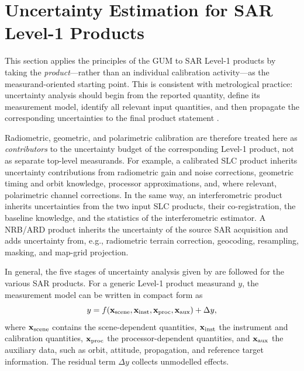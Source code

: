 \section{Uncertainty Estimation for SAR Level-1 Products} \label{sec:level1}

This section applies the principles of the \ac{GUM} to \ac{SAR} Level-1
products by taking the \emph{product}---rather than an individual calibration
activity---as the measurand-oriented starting point. This is consistent with
metrological practice: uncertainty analysis should begin from the reported
quantity, define its measurement model, identify all relevant input quantities,
and then propagate the corresponding uncertainties to the final product
statement \cite{JCGMGUM,QA4EO3}.


Radiometric, geometric, and polarimetric calibration are therefore treated here
as \emph{contributors} to the uncertainty budget of the corresponding Level-1
product, not as separate top-level measurands. For example, a calibrated \ac{SLC}
product inherits uncertainty contributions from radiometric gain and noise
corrections, geometric timing and orbit knowledge, processor approximations,
and, where relevant, polarimetric channel corrections. In the same way, an
interferometric product inherits uncertainties from the two input \ac{SLC}
products, their co-registration, the baseline knowledge, and the statistics of
the interferometric estimator. A \ac{NRB}/\ac{ARD} product inherits the
uncertainty of the source \ac{SAR} acquisition and adds uncertainty from, e.g.,
radiometric terrain correction, geocoding, resampling, masking, and map-grid
projection.

In general, the five stages of uncertainty analysis given by \cite{QA4EO1} are
followed for the various \ac{SAR} products. For a generic Level-1 product
measurand $y$, the measurement model can be written in compact form as
\begin{equation}
  y = f\!\left(\mathbf{x}_{\rm scene}, \mathbf{x}_{\rm inst},
  \mathbf{x}_{\rm proc}, \mathbf{x}_{\rm aux}\right) + \Delta y,
  \label{eq:l1_product_generic_model}
\end{equation}
where $\mathbf{x}_{\rm scene}$ contains the scene-dependent quantities,
$\mathbf{x}_{\rm inst}$ the instrument and calibration quantities,
$\mathbf{x}_{\rm proc}$ the processor-dependent quantities, and
$\mathbf{x}_{\rm aux}$ the auxiliary data, such as orbit, attitude,
propagation, and reference target information. The residual term $\Delta y$
collects unmodelled effects.

